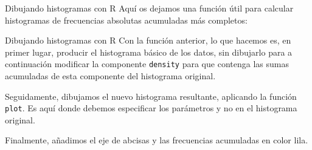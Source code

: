 \documentclass[
  ignorenonframetext,
]{beamer}
\newenvironment{Shaded}{\begin{snugshade}}{\end{snugshade}}
\newcommand{\AttributeTok}[1]{\textcolor[rgb]{0.13,0.29,0.53}{#1}}
\newcommand{\ConstantTok}[1]{\textcolor[rgb]{0.56,0.35,0.01}{#1}}
\newcommand{\ControlFlowTok}[1]{\textcolor[rgb]{0.13,0.29,0.53}{\textbf{#1}}}
\newcommand{\DecValTok}[1]{\textcolor[rgb]{0.00,0.00,0.81}{#1}}
\newcommand{\FunctionTok}[1]{\textcolor[rgb]{0.13,0.29,0.53}{\textbf{#1}}}
\newcommand{\NormalTok}[1]{#1}
\newcommand{\OtherTok}[1]{\textcolor[rgb]{0.56,0.35,0.01}{#1}}
\newcommand{\SpecialCharTok}[1]{\textcolor[rgb]{0.81,0.36,0.00}{\textbf{#1}}}
\newcommand{\StringTok}[1]{\textcolor[rgb]{0.31,0.60,0.02}{#1}}
\begin{document}
\begin{frame}[fragile]{Dibujando histogramas con R}
\label{dibujando-histogramas-con-r-7}
Aquí os dejamos una función útil para calcular histogramas de
frecuencias absolutas acumuladas más completos:

\begin{Shaded}
\end{Shaded}
\end{frame}

\begin{frame}[fragile]{Dibujando histogramas con R}
\label{dibujando-histogramas-con-r-8}
Con la función anterior, lo que hacemos es, en primer lugar, producir el
histograma básico de los datos, sin dibujarlo para a continuación
modificar la componente \texttt{density} para que contenga las sumas
acumuladas de esta componente del histograma original.

Seguidamente, dibujamos el nuevo histograma resultante, aplicando la
función \texttt{plot}. Es aquí donde debemos especificar los parámetros
y no en el histograma original.

Finalmente, añadimos el eje de abcisas y las frecuencias acumuladas en
color lila.
\end{frame}
\end{document}
